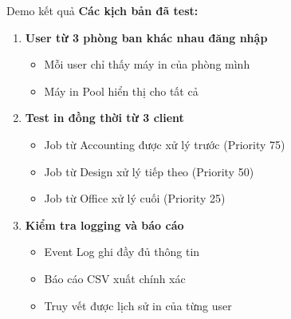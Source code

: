 \documentclass{beamer}
\begin{document}
    \begin{frame}{Demo kết quả}
        \textbf{Các kịch bản đã test:}
        \begin{enumerate}
            \item \textbf{User từ 3 phòng ban khác nhau đăng nhập}
                \begin{itemize}
                    \item Mỗi user chỉ thấy máy in của phòng mình
                    \item Máy in Pool hiển thị cho tất cả
                \end{itemize}
            \item \textbf{Test in đồng thời từ 3 client}
                \begin{itemize}
                    \item Job từ Accounting được xử lý trước (Priority 75)
                    \item Job từ Design xử lý tiếp theo (Priority 50)
                    \item Job từ Office xử lý cuối (Priority 25)
                \end{itemize}
            \item \textbf{Kiểm tra logging và báo cáo}
                \begin{itemize}
                    \item Event Log ghi đầy đủ thông tin
                    \item Báo cáo CSV xuất chính xác
                    \item Truy vết được lịch sử in của từng user
                \end{itemize}
        \end{enumerate}
    \end{frame}

\end{document}
